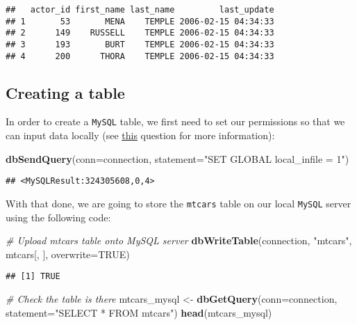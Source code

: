 \documentclass[
]{article}
\newenvironment{Shaded}{\begin{snugshade}}{\end{snugshade}}
\newcommand{\CommentTok}[1]{\textcolor[rgb]{0.56,0.35,0.01}{\textit{#1}}}
\newcommand{\DataTypeTok}[1]{\textcolor[rgb]{0.13,0.29,0.53}{#1}}
\newcommand{\KeywordTok}[1]{\textcolor[rgb]{0.13,0.29,0.53}{\textbf{#1}}}
\newcommand{\NormalTok}[1]{#1}
\newcommand{\OtherTok}[1]{\textcolor[rgb]{0.56,0.35,0.01}{#1}}
\newcommand{\StringTok}[1]{\textcolor[rgb]{0.31,0.60,0.02}{#1}}
\begin{document}
\begin{verbatim}
##   actor_id first_name last_name         last_update
## 1       53       MENA    TEMPLE 2006-02-15 04:34:33
## 2      149    RUSSELL    TEMPLE 2006-02-15 04:34:33
## 3      193       BURT    TEMPLE 2006-02-15 04:34:33
## 4      200      THORA    TEMPLE 2006-02-15 04:34:33
\end{verbatim}

\hypertarget{creating-a-table}{%
\subsection{Creating a table}\label{creating-a-table}}

In order to create a \texttt{MySQL} table, we first need to set our
permissions so that we can input data locally (see
\href{https://stackoverflow.com/questions/44288358/is-there-a-faster-way-to-upload-data-from-r-to-mysql}{this}
question for more information):

\begin{Shaded}
\begin{Highlighting}[]
\KeywordTok{dbSendQuery}\NormalTok{(}\DataTypeTok{conn=}\NormalTok{connection, }\DataTypeTok{statement=}\StringTok{"SET GLOBAL local\_infile = 1"}\NormalTok{)}
\end{Highlighting}
\end{Shaded}

\begin{verbatim}
## <MySQLResult:324305608,0,4>
\end{verbatim}

With that done, we are going to store the \texttt{mtcars} table on our
local \texttt{MySQL} server using the following code:

\begin{Shaded}
\begin{Highlighting}[]
\CommentTok{\# Upload mtcars table onto MySQL server}
\KeywordTok{dbWriteTable}\NormalTok{(connection, }\StringTok{"mtcars"}\NormalTok{, mtcars[, ], }\DataTypeTok{overwrite=}\OtherTok{TRUE}\NormalTok{)}
\end{Highlighting}
\end{Shaded}

\begin{verbatim}
## [1] TRUE
\end{verbatim}

\begin{Shaded}
\begin{Highlighting}[]
\CommentTok{\# Check the table is there}
\NormalTok{mtcars\_mysql \textless{}{-}}\StringTok{ }\KeywordTok{dbGetQuery}\NormalTok{(}\DataTypeTok{conn=}\NormalTok{connection, }\DataTypeTok{statement=}\StringTok{"SELECT * FROM mtcars"}\NormalTok{)}
\KeywordTok{head}\NormalTok{(mtcars\_mysql)}
\end{Highlighting}
\end{Shaded}
\end{document}
